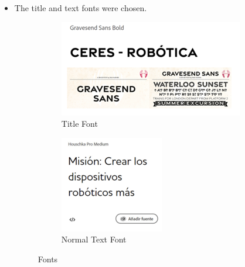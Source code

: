 \documentclass{article}
\begin{document}
\begin{itemize}
\begin{figure}[H]
    \end{figure}
    \item The title and text fonts were chosen. 
    \begin{figure}[H]
        \centering
        \begin{subfigure}{.5\textwidth}
          \centering
          \includegraphics[width=.8\linewidth]{Images/Design/Font1V1.png}
          \caption{Title Font}
          
        \end{subfigure}%
        \begin{subfigure}{.5\textwidth}
          \centering
          \includegraphics[width=.8\linewidth]{Images/Design/Font2V1.png}
          \caption{Normal Text Font}
          
        \end{subfigure}
        \caption{Fonts}
        
    \end{figure}

\end{itemize}
\end{document}
